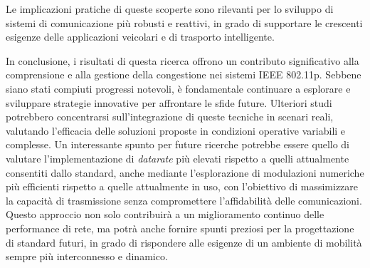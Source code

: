 Le implicazioni pratiche di queste scoperte sono rilevanti per lo sviluppo di sistemi di comunicazione più robusti e reattivi, in grado di supportare le crescenti esigenze delle applicazioni veicolari e di trasporto intelligente.

In conclusione, i risultati di questa ricerca offrono un contributo significativo alla comprensione e alla gestione della congestione nei sistemi IEEE 802.11p. Sebbene siano stati compiuti progressi notevoli, è fondamentale continuare a esplorare e sviluppare strategie innovative per affrontare le sfide future. Ulteriori studi potrebbero concentrarsi sull'integrazione di queste tecniche in scenari reali, valutando l'efficacia delle soluzioni proposte in condizioni operative variabili e complesse. Un interessante spunto per future ricerche potrebbe essere quello di valutare l'implementazione di \textit{datarate} più elevati rispetto a quelli attualmente consentiti dallo standard, anche mediante l'esplorazione di modulazioni numeriche più efficienti rispetto a quelle attualmente in uso, con l'obiettivo di massimizzare la capacità di trasmissione senza compromettere l'affidabilità delle comunicazioni. Questo approccio non solo contribuirà a un miglioramento continuo delle performance di rete, ma potrà anche fornire spunti preziosi per la progettazione di standard futuri, in grado di rispondere alle esigenze di un ambiente di mobilità sempre più interconnesso e dinamico.